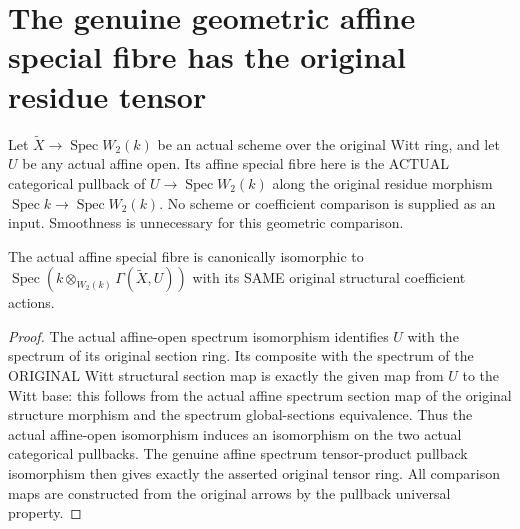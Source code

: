 \section{The genuine geometric affine special fibre has the original residue tensor}
\label{sec:witt-two-affine-residue-geometry}

Let $\widetilde X\to\operatorname{Spec}W_2(k)$ be an actual
scheme over the original Witt ring, and let $U$ be any actual
affine open. Its affine special fibre here is the ACTUAL
categorical pullback of $U\to\operatorname{Spec}W_2(k)$ along
the original residue morphism $\operatorname{Spec}k\to
\operatorname{Spec}W_2(k)$. No scheme or coefficient comparison
is supplied as an input. Smoothness is unnecessary for this
geometric comparison.

\begin{theorem}
\label{thm:witt-two-actual-affine-special-fibre-iso}
\leanok
The actual affine special fibre is canonically isomorphic to
$\operatorname{Spec}(k\otimes_{W_2(k)}\Gamma(\widetilde X,U))$
with its SAME original structural coefficient actions.
\end{theorem}
\begin{proof}
The actual affine-open spectrum isomorphism identifies $U$ with
the spectrum of its original section ring. Its composite with
the spectrum of the ORIGINAL Witt structural section map is
exactly the given map from $U$ to the Witt base: this follows
from the actual affine spectrum section map of the original
structure morphism and the spectrum global-sections equivalence.
Thus the actual affine-open isomorphism induces an isomorphism
on the two actual categorical pullbacks. The genuine affine
spectrum tensor-product pullback isomorphism then gives exactly
the asserted original tensor ring. All comparison maps are
constructed from the original arrows by the pullback universal
property.
\end{proof}

